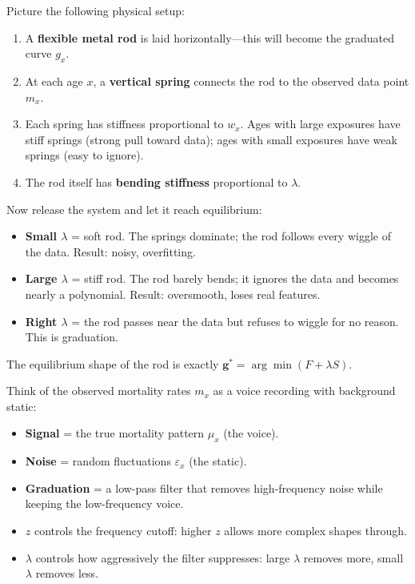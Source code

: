 \documentclass[11pt,a4paper]{article}
\begin{document}
\begin{intuition}
Picture the following physical setup:

\begin{enumerate}[nosep]
  \item A \textbf{flexible metal rod} is laid horizontally---this will become the graduated curve $g_x$.
  \item At each age $x$, a \textbf{vertical spring} connects the rod to the observed data point $m_x$.
  \item Each spring has stiffness proportional to $w_x$.  Ages with large exposures have stiff springs (strong pull toward data); ages with small exposures have weak springs (easy to ignore).
  \item The rod itself has \textbf{bending stiffness} proportional to $\lambda$.
\end{enumerate}

Now release the system and let it reach equilibrium:
\begin{itemize}[nosep]
  \item \textbf{Small $\lambda$} = soft rod.  The springs dominate; the rod follows every wiggle of the data.  Result: noisy, overfitting.
  \item \textbf{Large $\lambda$} = stiff rod.  The rod barely bends; it ignores the data and becomes nearly a polynomial.  Result: oversmooth, loses real features.
  \item \textbf{Right $\lambda$} = the rod passes near the data but refuses to wiggle for no reason.  This is graduation.
\end{itemize}

The equilibrium shape of the rod is exactly $\bm{g}^* = \arg\min (F + \lambda S)$.
\end{intuition}

\begin{intuition}
Think of the observed mortality rates $m_x$ as a voice recording with background static:
\begin{itemize}[nosep]
  \item \textbf{Signal} = the true mortality pattern $\mu_x$ (the voice).
  \item \textbf{Noise} = random fluctuations $\varepsilon_x$ (the static).
  \item \textbf{Graduation} = a low-pass filter that removes high-frequency noise while keeping the low-frequency voice.
  \item \textbf{$z$} controls the frequency cutoff: higher $z$ allows more complex shapes through.
  \item \textbf{$\lambda$} controls how aggressively the filter suppresses: large $\lambda$ removes more, small $\lambda$ removes less.
\end{itemize}
\end{intuition}
\end{document}
